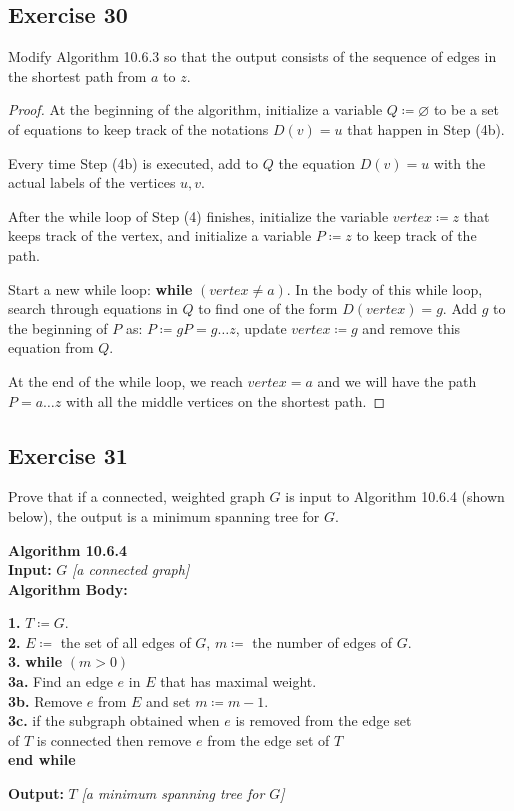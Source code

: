 \documentclass[14pt]{extarticle}
\newcommand{\es}{\varnothing}
\newcommand{\cy}{\color{cyan}}
\begin{document}
\subsection{Exercise 30}
Modify Algorithm 10.6.3 so that the output consists of the sequence of edges in the shortest path from \(a\) to \(z\).

\begin{proof}
At the beginning of the algorithm, initialize a variable \(Q \coloneqq \es\) to be a set of equations to keep track of the 
notations \(D(v) = u\) that happen in Step (4b).

Every time Step (4b) is executed, add to \(Q\) the equation \(D(v) = u\) with the actual labels of the vertices \(u,v\).

After the while loop of Step (4) finishes, initialize the variable \(vertex \coloneqq z\) that keeps track of the 
vertex, and initialize a variable \(P \coloneqq z\) to keep track of the path. 

Start a new while loop: {\bf while} \((vertex \neq a)\). In the body of this while loop, search through equations in \(Q\)
to find one of the form \(D(vertex) = g\). Add \(g\) to the beginning of \(P\) as: \(P \coloneqq gP = g \ldots z\), update \(vertex \coloneqq g\) and remove this equation from \(Q\).

At the end of the while loop, we reach \(vertex = a\) and we will have the path \(P = a \ldots z\) with all the middle 
vertices on the shortest path.
\end{proof}

\subsection{Exercise 31}
Prove that if a connected, weighted graph \(G\) is input to Algorithm 10.6.4 (shown below), the output is a minimum 
spanning tree for \(G\).

\begin{tcolorbox}[colframe=cyan]
{\bf \cy Algorithm 10.6.4} \\
{\bf Input:} \(G\) {\it [a connected graph]} \\
{\bf Algorithm Body:}
\begin{tabbing}
{\bf 1.} \(T \coloneqq G\). \\
{\bf 2.} \(E \coloneqq\) the set of all edges of \(G\), \(m \coloneqq\) the number of edges of \(G\). \\
{\bf 3.} {\bf while} \= \((m > 0)\) \\
               \> {\bf 3a.} Find an edge \(e\) in \(E\) that has maximal weight. \\
							\> {\bf 3b.} Remove \(e\) from \(E\) and set \(m \coloneqq m - 1\). \\
               \> {\bf 3c.} if the subgraph obtained when \(e\) is removed from the edge set \\
               \> of \(T\) is connected then remove \(e\) from the edge set of \(T\) \\
{\bf end while} 
\end{tabbing}
{\bf Output:} \(T\) {\it [a minimum spanning tree for \(G\)]}
\end{tcolorbox}
\end{document}
